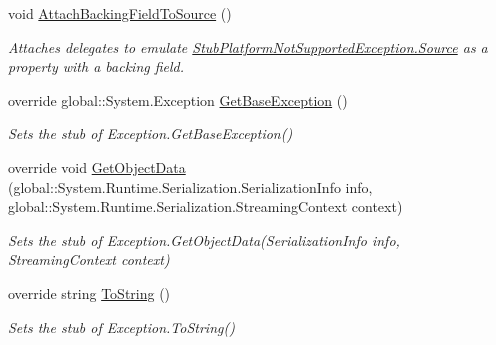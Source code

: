 \begin{DoxyCompactItemize}
void \hyperlink{class_system_1_1_fakes_1_1_stub_platform_not_supported_exception_a621a69cdacdca882f83688c664bffadd}{Attach\-Backing\-Field\-To\-Source} ()
\begin{DoxyCompactList}\small\item\em Attaches delegates to emulate \hyperlink{class_system_1_1_fakes_1_1_stub_platform_not_supported_exception_a10c3402c4ef61786b4d0824a8fc7f87e}{Stub\-Platform\-Not\-Supported\-Exception.\-Source} as a property with a backing field.\end{DoxyCompactList}\item 
override global\-::\-System.\-Exception \hyperlink{class_system_1_1_fakes_1_1_stub_platform_not_supported_exception_a69726d00345051dff1e10945d33d771c}{Get\-Base\-Exception} ()
\begin{DoxyCompactList}\small\item\em Sets the stub of Exception.\-Get\-Base\-Exception()\end{DoxyCompactList}\item 
override void \hyperlink{class_system_1_1_fakes_1_1_stub_platform_not_supported_exception_a817358776258ffec51ded8338475ff87}{Get\-Object\-Data} (global\-::\-System.\-Runtime.\-Serialization.\-Serialization\-Info info, global\-::\-System.\-Runtime.\-Serialization.\-Streaming\-Context context)
\begin{DoxyCompactList}\small\item\em Sets the stub of Exception.\-Get\-Object\-Data(\-Serialization\-Info info, Streaming\-Context context)\end{DoxyCompactList}\item 
override string \hyperlink{class_system_1_1_fakes_1_1_stub_platform_not_supported_exception_a8d1822fbe4e344e2d7631e6694d78478}{To\-String} ()
\begin{DoxyCompactList}\small\item\em Sets the stub of Exception.\-To\-String()\end{DoxyCompactList}\end{DoxyCompactItemize}

